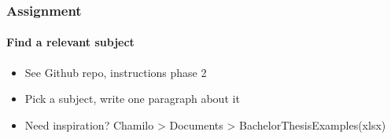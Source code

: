 \documentclass[aspectratio=169]{beamer}
\begin{document}
    \begin{frame}
        \frametitle{Assignment}
        \framesubtitle{Find a relevant subject}
        
        \begin{itemize}
            \item See Github repo, instructions phase 2
            \item Pick a subject, write one paragraph about it
            \item Need inspiration? Chamilo > Documents > BachelorThesisExamples(xlsx)
        \end{itemize}
        
    \end{frame}
    
\end{document}
